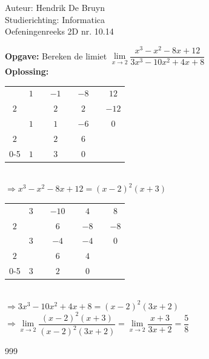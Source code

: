 \documentclass[a4paper]{article}
\begin{document}
  
\noindent \large Auteur: Hendrik De Bruyn \\
\noindent \large Studierichting: Informatica\\
\noindent \large Oefeningenreeks 2D nr. 10.14\\

\medskip

\normalsize

\textbf{Opgave:} Bereken de limiet $\lim\limits_{x \rightarrow 2} \dfrac{x^3 - x^2 - 8x + 12}{3x^3 - 10x^2 +4x + 8}$ \\

\textbf{Oplossing:} \\

\begin{tabular}{c|ccccccc}
    & $1$ && $-1$ && $-8$ && $12$ \\
    $2$ & && $2$ && $2$ && $-12$ \\ \hline
    & $1$ && $1$ && $-6$ &\vline&$0$ \\
    $2$ & && $2$ && $6$ \\ \cline{0-5}
    & $1$ && $3$ &\vline& $0$ \\
\end{tabular} \\

$\Rightarrow x^3 - x^2 - 8x + 12 = (x-2)^2(x+3)$ \\

\begin{tabular}{c|ccccccc}
    & $3$ && $-10$ && $4$ && $8$ \\
    $2$ & && $6$ && $-8$ && $-8$ \\ \hline
    & $3$ && $-4$ && $-4$ &\vline&$0$ \\
    $2$ & && $6$ && $4$ \\ \cline{0-5}
    & $3$ && $2$ &\vline& $0$ \\
\end{tabular} \\

$\Rightarrow 3x^3 - 10x^2 +4x + 8 = (x-2)^2(3x+2)$ \\

$\Rightarrow \lim\limits_{x \rightarrow 2} \dfrac{(x-2)^2(x+3)}{(x-2)^2(3x+2)}
= \lim\limits_{x \rightarrow 2} \dfrac{x+3}{3x+2}
= \dfrac{5}{8}$ \\

\begin{thebibliography}{999}
\end{thebibliography}
\end{document}
